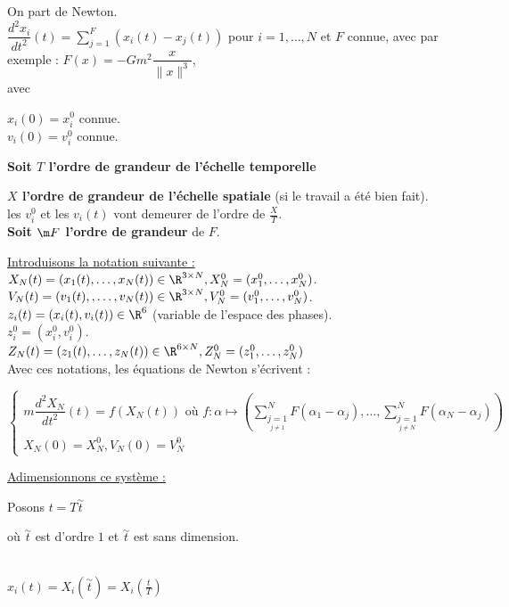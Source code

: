 \documentclass[12pt,a4paper]{article}
\begin{document}
	\vspace{-.2cm}
	
	On part de Newton.\\
	$\dfrac{d^2 x_i}{dt^2}(t) = \displaystyle\sum_{j=1}^F(x_i(t)-x_j(t))$ pour $i = 1,\ldots,N$ et $F$ connue, avec par exemple : $F(x) = -Gm^2\dfrac{x}{\|x\|^3}$,\\
	avec \begin{minipage}[t]{4cm}
		$x_i(0) = x_i^0$ connue.\\
		$v_i(0) = v_i^0$ connue.
	\end{minipage}
	\begin{minipage}[t]{10cm}
		\textbf{Soit $T$ l'ordre de grandeur de l'échelle temporelle}
	\end{minipage}
	
	\textbf{$X$ l'ordre de grandeur de l'échelle spatiale} (si le travail a été bien fait).\\
	les $v_i^0$ et les $v_i(t)$ vont demeurer de l'ordre de $\frac{X}{T}$.\\
	\textbf{Soit $\m F$ l'ordre de grandeur} de $F$.
	
	\underline{Introduisons la notation suivante :}\\
	\hspace{3cm} $X_N(t) = (x_1(t),\ldots,x_N(t)) \in \R^{3\times N}, X_N^0 = (x_1^0,\ldots,x_N^0)$.\\
	$V_N(t) = (v_1(t),,\ldots,v_N(t)) \in \R^{3\times N}, V_N^0 = (v_1^0,\ldots,v_N^0)$.\\
	$z_i(t) = (x_i(t),v_i(t)) \in \R^6$ (variable de l'espace des phases).\\
	$z_i^0 = (x_i^0,v_i^0)$.\\
	$Z_N(t) = (z_1(t),\ldots,z_N(t))\in\R^{6\times N}, Z_N^0 = (z_1^0,\ldots,z_N^0)$\\
	Avec ces notations, les équations de Newton s'écrivent :
	\begin{center}
		
		$\begin{cases}
			m \dfrac{d^2 X_N}{dt^2}(t) = f(X_N(t)) \text{ où } f : \alpha \mapsto \left(\displaystyle\sum_{\underset{j\not = 1}{j=1}}^N F(\alpha_1-\alpha_j),\ldots,\sum_{\underset{j\not = N}{j=1}}^N F(\alpha_N-\alpha_j)\right)\\
			X_N(0) = X_N^0, V_N(0) = V_N^0
		\end{cases}$
	\end{center}
	
	\underline{Adimensionnons ce système :} \begin{minipage}[t]{15cm}
		Posons $t = T \overset{\sim}{t}$ \hspace{1cm} \begin{minipage}[t]{4 cm}
			où $\overset{\sim}{t}$  est d'ordre $1$ et $\overset{\sim}{t}$  est sans dimension.
		\end{minipage}\\		
		$x_i(t) = X_i(\overset{\sim}{t}) = X_i\left(\frac{t}{T}\right)$
	\end{minipage}
	
\end{document}
